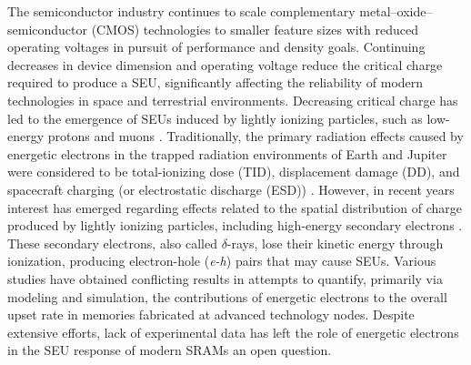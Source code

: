 The semiconductor industry continues to scale complementary metal--oxide-- semiconductor (CMOS) technologies to smaller feature sizes with reduced operating voltages in pursuit of performance and density goals.
Continuing decreases in device dimension and operating voltage reduce the critical charge required to produce a SEU, significantly affecting the reliability of modern technologies in space and terrestrial environments. 
Decreasing critical charge has led to the emergence of SEUs induced by lightly ionizing particles, such as low-energy protons and muons \cite{Rodbell:2007vl, Sierawski:2010cj}. 
Traditionally, the primary radiation effects caused by energetic electrons in the trapped radiation environments of Earth and Jupiter were considered to be total-ionizing dose (TID), displacement damage (DD), and spacecraft charging (or electrostatic discharge (ESD)) \cite{Bourdarie:kj, Xapsos:2013cu}. 
However, in recent years interest has emerged regarding effects related to the spatial distribution of charge produced by lightly ionizing particles, including high-energy secondary electrons \cite{Weller:2003je, Raine:2010cna, Raine:gk, Raine:2012gi, King:2010cu, King:2012cb, Barak:2012im}. 
These secondary electrons, also called $\delta$-rays, lose their kinetic energy through ionization, producing electron-hole (\emph{e-h}) pairs that may cause SEUs. 
Various studies \cite{Weller:2003je, Raine:2010cna, Raine:gk, Raine:2012gi, King:2010cu, King:2012cb, Barak:2012im} have obtained conflicting results in attempts to quantify, primarily via modeling and simulation, the contributions of energetic electrons to the overall upset rate in memories fabricated at advanced technology nodes. 
Despite extensive efforts, lack of experimental data has left the role of energetic electrons in the SEU response of modern SRAMs an open question.

